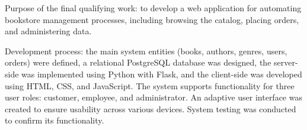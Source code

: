 Purpose of the final qualifying work: to develop a web application for automating bookstore management processes, including browsing the catalog, placing orders, and administering data.

Development process: the main system entities (books, authors, genres, users, orders) were defined, a relational PostgreSQL database was designed, the server-side was implemented using Python with Flask, and the client-side was developed using HTML, CSS, and JavaScript. The system supports functionality for three user roles: customer, employee, and administrator. An adaptive user interface was created to ensure usability across various devices. System testing was conducted to confirm its functionality.
